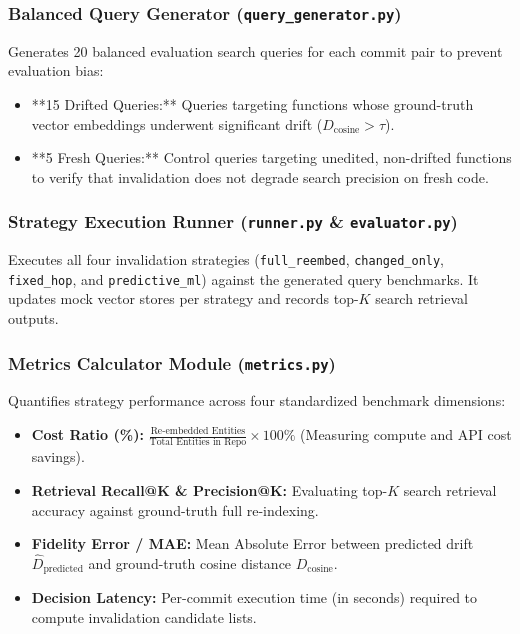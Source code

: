 \documentclass[conference]{IEEEtran}
\begin{document}
\subsubsection{Balanced Query Generator (\texttt{query\_generator.py})}
Generates 20 balanced evaluation search queries for each commit pair to prevent evaluation bias:
\begin{itemize}
    \item **15 Drifted Queries:** Queries targeting functions whose ground-truth vector embeddings underwent significant drift ($D_{\text{cosine}} > \tau$).
    \item **5 Fresh Queries:** Control queries targeting unedited, non-drifted functions to verify that invalidation does not degrade search precision on fresh code.
\end{itemize}

\subsubsection{Strategy Execution Runner (\texttt{runner.py} \& \texttt{evaluator.py})}
Executes all four invalidation strategies (\texttt{full\_reembed}, \texttt{changed\_only}, \texttt{fixed\_hop}, and \texttt{predictive\_ml}) against the generated query benchmarks. It updates mock vector stores per strategy and records top-$K$ search retrieval outputs.

\subsubsection{Metrics Calculator Module (\texttt{metrics.py})}
Quantifies strategy performance across four standardized benchmark dimensions:
\begin{itemize}
    \item \textbf{Cost Ratio (\%):} $\frac{\text{Re-embedded Entities}}{\text{Total Entities in Repo}} \times 100\%$ (Measuring compute and API cost savings).
    \item \textbf{Retrieval Recall@K \& Precision@K:} Evaluating top-$K$ search retrieval accuracy against ground-truth full re-indexing.
    \item \textbf{Fidelity Error / MAE:} Mean Absolute Error between predicted drift $\hat{D}_{\text{predicted}}$ and ground-truth cosine distance $D_{\text{cosine}}$.
    \item \textbf{Decision Latency:} Per-commit execution time (in seconds) required to compute invalidation candidate lists.
\end{itemize}
\end{document}
